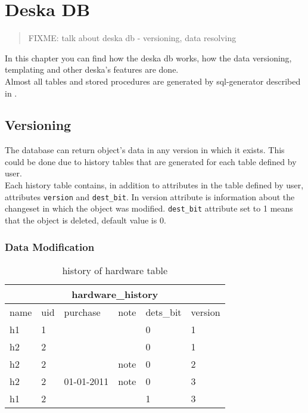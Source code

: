 \documentclass[deska]{subfiles}
\begin{document}
\chapter{Deska DB}
\label{sec:deska-db}

\begin{abstract}
FIXME: talk about deska db - versioning, data resolving
\end{abstract}

In this chapter you can find how the deska db works, how the data versioning, templating and other deska's features are done.\\
Almost all tables and stored procedures are generated by sql-generator described in .

\section{Versioning}
\label{sec:versioning}

The database can return object's data in any version in which it exists. This could be done due to history tables that are generated for each table defined by user.\\
Each history table contains, in addition to attributes in the table defined by user, attributes {\tt version} and {\tt dest\_bit}. In version attribute is information about the changeset in which the object was modified. {\tt dest\_bit} attribute set to 1 means that the object is deleted, default value is 0.\\

\subsection{Data Modification}
\begin{center}

\begin{table}
    \caption{history of hardware table}
    \label{tab-example-hardwarehist}
\begin{tabular}{ | l | l | l | l | l | l |}
    \hline
    \multicolumn{6}{|c|}{hardware\_history}\\
    \hline
    name & uid & purchase & note & dets\_bit & version\\
    \hline
    h1 & 1 & & & 0 & 1 \\
    h2 & 2 & & & 0 & 1 \\
    h2 & 2 & & note & 0 & 2 \\
    h2 & 2 & 01-01-2011 & note & 0 & 3 \\
    h1 & 2 & & & 1 & 3 \\
    \hline
\end{tabular}
\end{table}

\end{center}
\end{document}
